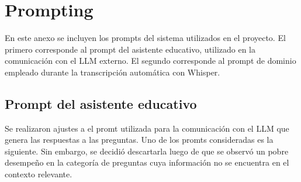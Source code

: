 
\chapter{Prompting}
\label{chapter:A-1-Anexo II-Prompting}
En este anexo se incluyen los prompts del sistema utilizados en el proyecto. El primero corresponde al prompt del asistente educativo, utilizado en la comunicación con el LLM externo. El segundo corresponde al prompt de dominio empleado durante la transcripción automática con Whisper.

\section{Prompt del asistente educativo}
\label{section:A-1-prompt-asistente}
Se realizaron ajustes a el promt utilizada para la comunicación con el LLM que genera las respuestas a las preguntas. Uno de los promts consideradas es la siguiente. Sin embargo, se decidió descartarla luego de que se observó un pobre desempeño en la categoría de preguntas cuya información no se encuentra en el contexto relevante. 

